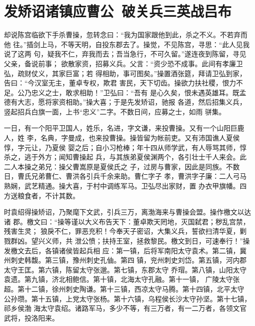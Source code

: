\chapter{发矫诏诸镇应曹公~破关兵三英战吕布}

却说陈宫临欲下手杀曹操，忽转念曰：“我为国家跟他到此，杀之不义。不若弃而他
往。”插剑上马，不等天明，自投东郡去了。操觉，不见陈宫，寻思：“此人见我说了这两
句，疑我不仁，弃我而去；吾当急行，不可久留。”遂连夜到陈留，寻见父亲，备说前事；
欲散家资，招募义兵。父言：“资少恐不成事。此间有孝廉卫弘，疏财仗义，其家巨富；若
得相助，事可图矣。”操置酒张筵，拜请卫弘到家，告曰：“今汉室无主，董卓专权，欺君
害民，天下切齿。操欲力扶社稷，恨力不足。公乃忠义之士，敢求相助！”卫弘曰：“吾有
是心久矣，恨未遇英雄耳。既孟德有大志，愿将家资相助。”操大喜；于是先发矫诏，驰报
各道，然后招集义兵，竖起招兵白旗一面，上书“忠义”二字。不数日间，应募之士，如雨
骈集。

一日，有一个阳平卫国人，姓乐，名进，字文谦，来投曹操。又有一个山阳巨鹿人，姓
李，名典，字曼成，也来投曹操。操皆留为帐前吏。又有沛国谯人夏侯惇，字元让，乃夏侯
婴之后；自小习枪棒；年十四从师学武，有人辱骂其师，惇杀之，逃于外方；闻知曹操起
兵，与其族弟夏侯渊两个，各引壮士千人来会。此二人本操之弟兄：操父曹嵩原是夏侯氏之
子，过房与曹家，因此是同族。不数日，曹氏兄弟曹仁、曹洪各引兵千余来助。曹仁字子
孝，曹洪字子廉：二人弓马熟娴，武艺精通。操大喜，于村中调练军马。卫弘尽出家财，置
办衣甲旗幡。四方送粮食者，不计其数。

时袁绍得操矫诏，乃聚麾下文武，引兵三万，离渤海来与曹操会盟。操作檄文以达诸
郡。檄文曰：“操等谨以大义布告天下：董卓欺天罔地，灭国弑君；秽乱宫禁，残害生灵；
狼戾不仁，罪恶充积！今奉天子密诏，大集义兵，誓欲扫清华夏，剿戮群凶。望兴义师，共
泄公愤；扶持王室，拯救黎民。檄文到日，可速奉行！”操发檄文去后，各镇诸侯皆起兵相
应：第一镇，后将军南阳太守袁术。第二镇，冀州刺史韩馥。第三镇，豫州刺史孔伷。第四
镇，兖州刺史刘岱。第五镇，河内郡太守王匡。第六镇，陈留太守张邈。第七镇，东郡太守
乔瑁。第八镇，山阳太守袁遗。第九镇，济北相鲍信。第十镇，北海太守孔融。第十一镇，
广陵太守张超。第十二镇，徐州刺史陶谦。第十三镇，西凉太守马腾。第十四镇，北平太守
公孙瓒。第十五镇，上党太守张杨。第十六镇，乌程侯长沙太守孙坚。第十七镇，祁乡侯渤
海太守袁绍。诸路军马，多少不等，有三万者，有一二万者，各领文官武将，投洛阳来。

